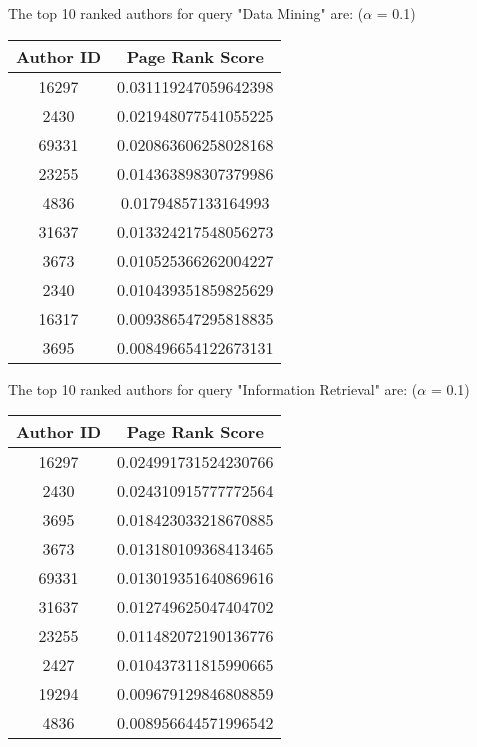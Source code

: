 \documentclass[paper=a4, fontsize=11pt]{scrartcl} %
\numberwithin{equation}{section} %
\numberwithin{figure}{section} %
\numberwithin{table}{section} %
\begin{document}
The top 10 ranked authors for query "Data Mining" are: ($\alpha$ = 0.1)
\begin{center}
 \begin{tabular}{||c | c||} 
 \hline
 Author ID & Page Rank Score\\ [0.5ex] 
 \hline\hline
 16297 & 0.031119247059642398\\ 
 \hline
 2430 & 0.021948077541055225\\
 \hline
 69331 & 0.020863606258028168\\
 \hline
 23255 & 0.014363898307379986\\ 
 \hline
 4836 & 0.01794857133164993\\ 
 \hline
 31637 & 0.013324217548056273\\
 \hline
 3673 & 0.010525366262004227\\
 \hline
 2340 & 0.010439351859825629\\
 \hline
 16317 & 0.009386547295818835\\
 \hline
 3695 & 0.008496654122673131\\ [1ex] 
 \hline
\end{tabular}
\end{center}

The top 10 ranked authors for query "Information Retrieval" are: ($\alpha$ = 0.1)
\begin{center}
 \begin{tabular}{||c | c||} 
 \hline
 Author ID & Page Rank Score\\ [0.5ex] 
 \hline\hline
 16297 & 0.024991731524230766\\ 
 \hline
 2430 & 0.024310915777772564\\
 \hline
 3695 & 0.018423033218670885\\
 \hline
 3673 & 0.013180109368413465\\ 
 \hline
 69331 & 0.013019351640869616\\ 
 \hline
 31637 & 0.012749625047404702\\
 \hline
 23255 & 0.011482072190136776\\
 \hline
 2427 & 0.010437311815990665\\
 \hline
 19294 & 0.009679129846808859\\
 \hline
 4836 & 0.008956644571996542\\ [1ex] 
 \hline
\end{tabular}
\end{center}


\end{document}
